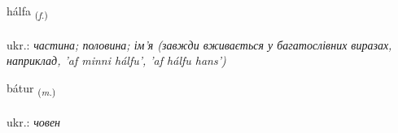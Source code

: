 \documentclass[frontgrid, backgrid]{flacards}\usepackage[]{graphicx}\usepackage[]{xcolor}
\begin{document}
\renewcommand{\flhead}{\vskip5pt \fboxsep=0pt {\small\bfseries\footnotesize Nafnorð | іменник}}
\renewcommand{\fcfoot}{\vskip5pt \fboxsep=0pt \hspace{2pt}{\small\bfseries\footnotesize 1K}}

\renewcommand{\blhead}{\vskip5pt {\small\bfseries\footnotesize Nafnorð | іменник }}
\renewcommand{\bcfoot}{\vskip5pt \hspace{2pt}{\small\bfseries\footnotesize 1K}}


{hálfa \small{\textsubscript{(\textit{f.})}} \\[1ex] %
\textphonetic{[haulva]} \\
ukr.: \emph{частина; половина; ім'я (завжди вживається у багатослівних виразах, наприклад, 'af minni hálfu', 'af hálfu hans')} \\  [2ex]
\renewcommand*{\arraystretch}{0.8}
}

\renewcommand{\flhead}{\vskip5pt \fboxsep=0pt {\small\bfseries\footnotesize Nafnorð | іменник}}
\renewcommand{\fcfoot}{\vskip5pt \fboxsep=0pt \hspace{2pt}{\small\bfseries\footnotesize 1K}}

\renewcommand{\blhead}{\vskip5pt {\small\bfseries\footnotesize Nafnorð | іменник }}
\renewcommand{\bcfoot}{\vskip5pt \hspace{2pt}{\small\bfseries\footnotesize 1K}}


{bátur \small{\textsubscript{(\textit{m.})}} \\[1ex] %
\textphonetic{[pauːtʏr]} \\
ukr.: \emph{човен} \\  [2ex]
\renewcommand*{\arraystretch}{0.8}
}
\end{document}
